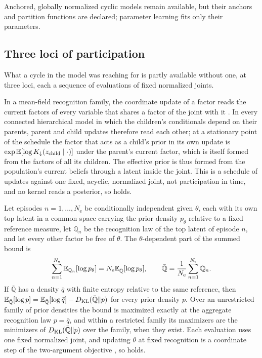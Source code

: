 Anchored, globally normalized cyclic models remain available, but their anchors and
partition functions are declared; parameter learning fits only their parameters.

\subsection{Three loci of participation}
\label{sec:obs-participatory}

What a cycle in the model was reaching for is partly available without one, at three
loci, each a sequence of evaluations of fixed normalized joints.

In a mean-field recognition family, the coordinate update of a factor reads the current
factors of every variable that shares a factor of the joint with it
\citep[Sec.~10.1.1]{Bishop2006}. In every connected hierarchical model in which the
children's conditionals depend on their parents, parent and child updates therefore
read each other; at a stationary point of the schedule the factor that acts as a child's
prior in its own update is $\exp\mathbb E[\log K_\downarrow(z_{\mathrm{child}}\mid
\cdot)]$ under the parent's current factor, which is itself formed from the factors of
all its children. The effective prior is thus formed from the population's current
beliefs through a latent inside the joint. This is a schedule of updates against one
fixed, acyclic, normalized joint, not participation in time, and no kernel reads a
posterior, so  holds. 

Let episodes $n=1,\ldots,N_{\mathrm e}$ be conditionally independent given $\theta$,
each with its own top latent in a common space carrying the prior density $p_\theta$
relative to a fixed reference measure, let $\mathbb Q_n$ be the recognition law of the
top latent of episode $n$, and let every other factor be free of $\theta$. The
$\theta$-dependent part of the summed bound is
\begin{equation}
\sum_{n=1}^{N_{\mathrm e}}\mathbb E_{\mathbb Q_n}[\log p_\theta]
=N_{\mathrm e}\mathbb E_{\bar{\mathbb Q}}[\log p_\theta],
\qquad
\bar{\mathbb Q}=\frac1{N_{\mathrm e}}\sum_{n=1}^{N_{\mathrm e}}\mathbb Q_n .
\label{eq:obs-aggregate-prior}
\end{equation}
If $\bar{\mathbb Q}$ has a density $\bar q$ with finite entropy relative to the same
reference, then $\mathbb E_{\bar{\mathbb Q}}[\log p]=\mathbb E_{\bar{\mathbb Q}}[\log\bar
q]-D_{\mathrm{KL}}(\bar{\mathbb Q}\Vert p)$ for every prior density $p$. Over an unrestricted
family of prior densities the bound is maximized exactly at the aggregate recognition
law $p=\bar q$, and within a restricted family its maximizers are the minimizers of
$D_{\mathrm{KL}}(\bar{\mathbb Q}\Vert p)$ over the family, when they exist. Each evaluation uses one
fixed normalized joint, and updating $\theta$ at fixed recognition is a coordinate
step of the two-argument objective \citep{Neal1998}, so
 holds. 

